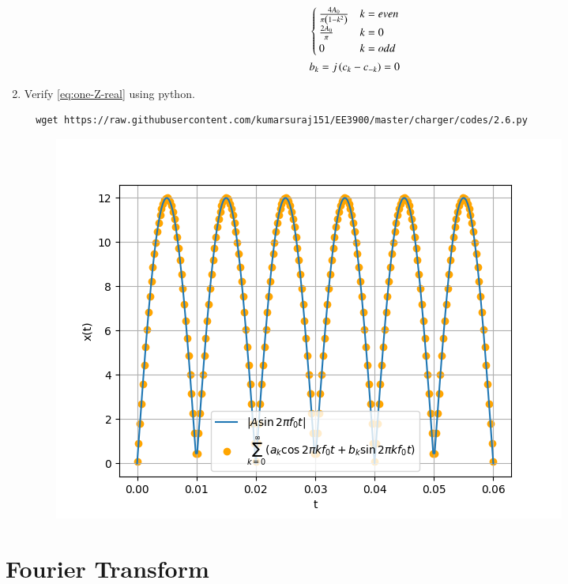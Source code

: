 \documentclass[journal,12pt,twocolumn]{IEEEtran}
\renewcommand\thesection{\arabic{section}}
\begin{document}
\begin{enumerate}[label=\thesection.\arabic*,ref=\thesection.\theenumi]
\begin{align}
\begin{cases}
\frac{4A_0}{\pi\left(1-k^2\right)}&k=even
\\
\frac{2A_0}{\pi}&k=0
\\
0&k=odd
\end{cases}\\
b_k=j\left(c_k-c_{-k}\right)=0
    \end{align}
\item Verify 
\eqref{eq:one-Z-real}
using python.\\
\solution 
  \begin{lstlisting}
  wget https://raw.githubusercontent.com/kumarsuraj151/EE3900/master/charger/codes/2.6.py
  \end{lstlisting}
    \begin{figure}[!ht]
\centering
\includegraphics[width=\columnwidth]{./figs/2.6}
\caption{}
\end{figure}

\end{enumerate}
\section{Fourier Transform}

 
\end{document}
